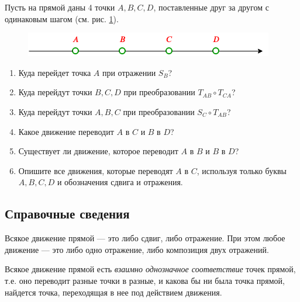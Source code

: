 Пусть на прямой даны 4 точки $A,B,C,D$, поставленные друг за другом с одинаковым шагом (см. рис. \ref{ABCD}).
\begin{figure}[hbt!]
\begin{center}
\includegraphics[scale=0.7]{../ABCD.png}
\end{center}
\caption{}\label{ABCD}
\end{figure}

\begin{enumerate}
\item Куда перейдет точка $A$ при отражении $S_B$?
\item Куда перейдут точки $B,C,D$ при преобразовании $T_{AB}\circ T_{CA}$?
\item Куда перейдут точки $A,B,C$ при преобразовании $S_C\circ T_{AB}$?
\item Какое движение переводит $A$ в $C$ и $B$ в $D$?
\item Существует ли движение, которое переводит $A$ в $B$ и $B$ в $D$?
\item Опишите все движения, которые переводят $A$ в $C$, используя только буквы $A,B,C,D$ и обозначения сдвига и отражения.
\end{enumerate}

\subsection*{Справочные сведения}

Всякое движение прямой --- это либо сдвиг, либо отражение. При этом любое движение --- это либо одно отражение, либо композиция двух отражений.

Всякое движение прямой есть \textit{взаимно однозначное соответствие} точек прямой, т.е. оно переводит разные точки в разные, и какова бы ни была точка прямой, найдется точка, переходящая в нее под действием движения.


